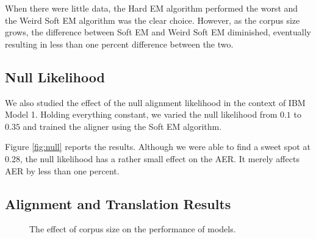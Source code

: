 \documentclass[12pt]{article}   %
\begin{document}
When there were little data, the Hard EM algorithm performed the worst and the Weird Soft EM algorithm was the clear choice. However, as the corpus size grows, the difference between Soft EM and Weird Soft EM diminished, eventually resulting in less than one percent difference between the two.


\subsection{Null Likelihood}
We also studied the effect of the null alignment likelihood in the context of IBM Model 1. Holding everything constant, we varied the null likelihood from $0.1$ to $0.35$ and trained the aligner using the Soft EM algorithm. 

Figure \ref{fig:null} reports the results. Although we were able to find a sweet spot at 0.28, the null likelihood has a rather small effect on the AER. It merely affects AER by less than one percent.


\subsection{Alignment and Translation Results}


\begin{figure}[h*]
\centering
{}
\label{fig:perf}
\caption{The effect of corpus size on the performance of models.}
\end{figure}
\end{document}
